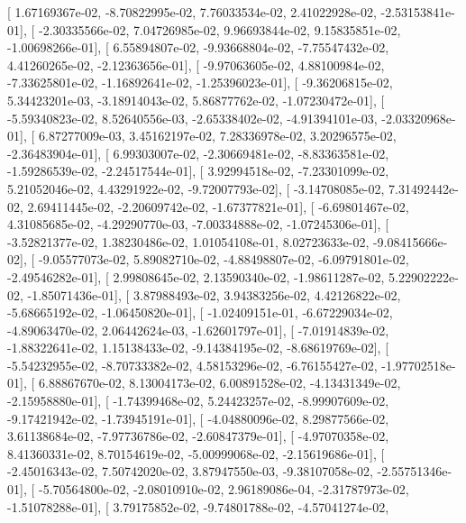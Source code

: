 \documentclass{article}
\begin{document}
       [  1.67169367e-02,  -8.70822995e-02,   7.76033534e-02,
          2.41022928e-02,  -2.53153841e-01],
       [ -2.30335566e-02,   7.04726985e-02,   9.96693844e-02,
          9.15835851e-02,  -1.00698266e-01],
       [  6.55894807e-02,  -9.93668804e-02,  -7.75547432e-02,
          4.41260265e-02,  -2.12363656e-01],
       [ -9.97063605e-02,   4.88100984e-02,  -7.33625801e-02,
         -1.16892641e-02,  -1.25396023e-01],
       [ -9.36206815e-02,   5.34423201e-03,  -3.18914043e-02,
          5.86877762e-02,  -1.07230472e-01],
       [ -5.59340823e-02,   8.52640556e-03,  -2.65338402e-02,
         -4.91394101e-03,  -2.03320968e-01],
       [  6.87277009e-03,   3.45162197e-02,   7.28336978e-02,
          3.20296575e-02,  -2.36483904e-01],
       [  6.99303007e-02,  -2.30669481e-02,  -8.83363581e-02,
         -1.59286539e-02,  -2.24517544e-01],
       [  3.92994518e-02,  -7.23301099e-02,   5.21052046e-02,
          4.43291922e-02,  -9.72007793e-02],
       [ -3.14708085e-02,   7.31492442e-02,   2.69411445e-02,
         -2.20609742e-02,  -1.67377821e-01],
       [ -6.69801467e-02,   4.31085685e-02,  -4.29290770e-03,
         -7.00334888e-02,  -1.07245306e-01],
       [ -3.52821377e-02,   1.38230486e-02,   1.01054108e-01,
          8.02723633e-02,  -9.08415666e-02],
       [ -9.05577073e-02,   5.89082710e-02,  -4.88498807e-02,
         -6.09791801e-02,  -2.49546282e-01],
       [  2.99808645e-02,   2.13590340e-02,  -1.98611287e-02,
          5.22902222e-02,  -1.85071436e-01],
       [  3.87988493e-02,   3.94383256e-02,   4.42126822e-02,
         -5.68665192e-02,  -1.06450820e-01],
       [ -1.02409151e-01,  -6.67229034e-02,  -4.89063470e-02,
          2.06442624e-03,  -1.62601797e-01],
       [ -7.01914839e-02,  -1.88322641e-02,   1.15138433e-02,
         -9.14384195e-02,  -8.68619769e-02],
       [ -5.54232955e-02,  -8.70733382e-02,   4.58153296e-02,
         -6.76155427e-02,  -1.97702518e-01],
       [  6.88867670e-02,   8.13004173e-02,   6.00891528e-02,
         -4.13431349e-02,  -2.15958880e-01],
       [ -1.74399468e-02,   5.24423257e-02,  -8.99907609e-02,
         -9.17421942e-02,  -1.73945191e-01],
       [ -4.04880096e-02,   8.29877566e-02,   3.61138684e-02,
         -7.97736786e-02,  -2.60847379e-01],
       [ -4.97070358e-02,   8.41360331e-02,   8.70154619e-02,
         -5.00999068e-02,  -2.15619686e-01],
       [ -2.45016343e-02,   7.50742020e-02,   3.87947550e-03,
         -9.38107058e-02,  -2.55751346e-01],
       [ -5.70564800e-02,  -2.08010910e-02,   2.96189086e-04,
         -2.31787973e-02,  -1.51078288e-01],
       [  3.79175852e-02,  -9.74801788e-02,  -4.57041274e-02,
\end{document}
